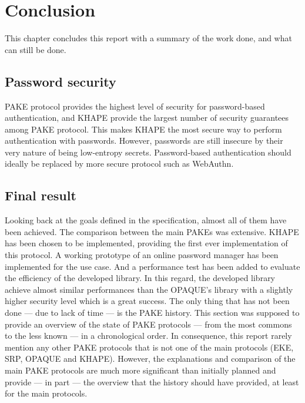 ﻿\documentclass[../report.tex]{subfiles}
\begin{document}
\chapter{Conclusion}
This chapter concludes this report with a summary of the work done, and what can still be done.
\section{Password security}
PAKE protocol provides the highest level of security for password-based authentication, and KHAPE provide the largest number of security guarantees among PAKE protocol. This makes KHAPE the most secure way to perform authentication with passwords.
However, passwords are still insecure by their very nature of being low-entropy secrets. Password-based authentication should ideally be replaced by more secure protocol such as WebAuthn.

\section{Final result}
Looking back at the goals defined in the specification, almost all of them have been achieved.
The comparison between the main PAKEs was extensive.
KHAPE has been chosen to be implemented, providing the first ever implementation of this protocol. %
A working prototype of an online password manager has been implemented for the use case.
And a performance test has been added to evaluate the efficiency of the developed library. In this regard, the developed library achieve almost similar performances than the OPAQUE's library with a slightly higher security level which is a great success.
The only thing that has not been done --- due to lack of time --- is the PAKE history. This section was supposed to provide an overview of the state of PAKE protocols --- from the most commons to the less known --- in a chronological order. In consequence, this report rarely mention any other PAKE protocols that is not one of the main protocols (EKE, SRP, OPAQUE and KHAPE). However, the explanations and comparison of the main PAKE protocols are much more significant than initially planned and provide --- in part --- the overview that the history should have provided, at least for the main protocols.


\end{document}
